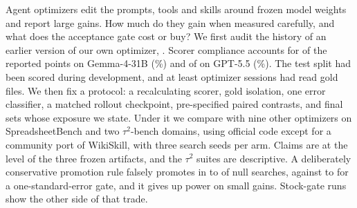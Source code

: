 Agent optimizers edit the prompts, tools and skills around frozen model weights and report large gains. How much do they gain when measured carefully, and what does the acceptance gate cost or buy?
We first audit the history of an earlier version of our own optimizer, \capevolve{}. Scorer compliance accounts for \histGemmaCompliancePts{} of the \histGemmaDeltaSaved{} reported points on Gemma-4-31B (\histGemmaComplianceShare{}\%) and \histGptCompliancePts{} of \histGptDeltaSaved{} on GPT-5.5 (\histGptComplianceShare{}\%). The test split had been scored during development, and at least \goldOptimizerRuns{} optimizer sessions had read gold files.
We then fix a protocol: a recalculating scorer, gold isolation, one error classifier, a matched rollout checkpoint, pre-specified paired contrasts, and final sets whose exposure we state.
Under it we compare \capevolve{} with nine other optimizers on SpreadsheetBench and two $\tau^2$-bench domains, using official code except for a community port of WikiSkill, with three search seeds per arm. Claims are at the level of the three frozen artifacts, and the $\tau^2$ suites are descriptive.
A deliberately conservative promotion rule falsely promotes in \simPFalseB{} to \simPFalseC{} of null searches, against \simKoneFalseB{} to \simKoneFalseA{} for a one-standard-error gate, and it gives up power on small gains. Stock-gate runs show the other side of that trade.
